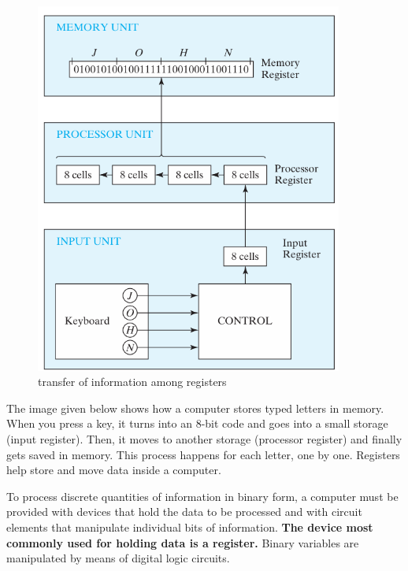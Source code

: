 \documentclass{article}
\begin{document}
\begin{figure}
\centering
    \includegraphics[width=0.9\textwidth]{figs/figure1.png}
    \caption{transfer of information among registers}
    \label{fig:enter-label}
\end{figure}

The image given below shows how a computer stores typed letters in memory. When you press a key, it turns into an 8-bit code and goes into a small storage (input register). Then, it moves to another storage (processor register) and finally gets saved in memory. This process happens for each letter, one by one. Registers help store and move data inside a computer.

\newpage
To process discrete quantities of information in binary form, a computer must be 
provided with devices that hold the data to be processed and with circuit elements that 
manipulate individual bits of information.\textbf{ The device most commonly used for holding 
data is a register.}
Binary variables are manipulated by means of digital logic circuits.
\end{document}

